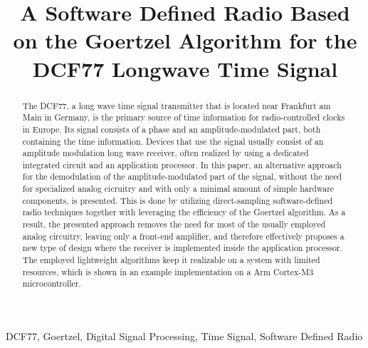 \documentclass[conference]{IEEEtran}
\begin{document}
\title{A Software Defined Radio Based on the Goertzel Algorithm for the DCF77 Longwave Time Signal}

\author{
}

\maketitle

\begin{abstract}
    The DCF77, a long wave time signal transmitter that is located near Frankfurt am Main in Germany, is the primary source of time information for
    radio-controlled clocks in Europe. Its signal consists of a phase and an amplitude-modulated part, both containing the time information.
    Devices that use the signal usually consist of an amplitude modulation long wave receiver, often realized by using a dedicated integrated circuit and an
    application processor. In this paper, an alternative approach for the demodulation of the amplitude-modulated part of the signal, without the need for specialized
    analog cicruitry and with only a minimal amount of simple hardware components, is presented.
    This is done by utilizing direct-sampling software-defined radio techniques together with leveraging the efficiency of the Goertzel algorithm.
    As a result, the presented approach removes the need for most of the usually employed analog circuitry, leaving only a front-end amplifier, and therefore
    effectively proposes a new type of design where the receiver is implemented inside the application processor.
    The employed lightweight algorithms keep it realizable on a system with limited resources, which is shown in an example implementation on a Arm Cortex-M3 microcontroller. 
\end{abstract}

\begin{IEEEkeywords}
    DCF77, Goertzel, Digital Signal Processing, Time Signal, Software Defined Radio
\end{IEEEkeywords}
\end{document}
